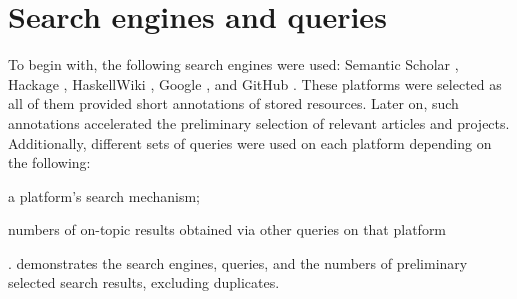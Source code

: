 \section{Search engines and queries} \label{sec:searchProcess}
To begin with, the following search engines were used: Semantic Scholar \cite{noauthor_semantic_nodate}, Hackage \cite{noauthor_packages_nodate}, HaskellWiki \cite{noauthor_haskellwiki_nodate}, Google \cite{noauthor_google_nodate-1}, and GitHub \cite {noauthor_build_nodate}. These platforms were selected as all of them provided short annotations of stored resources. Later on, such annotations accelerated the preliminary selection of relevant articles and projects. Additionally, different sets of queries were used on each platform depending on the following:
\begin{enumerate*}[ label=\arabic*) ]
    \item a platform's search mechanism;
    \item numbers of on-topic results obtained via other queries on that platform
\end{enumerate*}.
 demonstrates the search engines, queries, and the numbers of preliminary selected search results, excluding duplicates.

\newcommand{\centeredHeader}[1]{\multicolumn{1}{|c|}{\textbf{#1}}}


